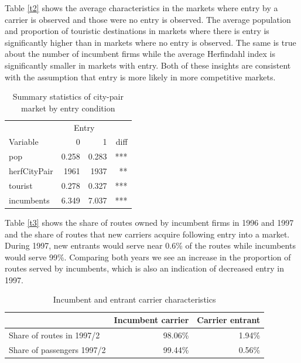 \documentclass[12pt,english]{article}
\begin{document}
\begin{enumerate}
Table \eqref{t2} shows the average characteristics in the markets where entry by a carrier is observed and those were no entry is observed. The average population and proportion of touristic destinations in markets where there is entry is significantly higher than in markets where no entry is observed. The same is true about the number of incumbent firms while the average Herfindahl index is significantly smaller in markets with entry. Both of these insights are consistent with the assumption that entry is more likely in more competitive markets. 

\begin{table}[H]
  \centering
  \caption{Summary statistics of city-pair market by entry condition}
    \begin{tabular}{lrrr}
    \hline
          & \multicolumn{2}{c}{Entry} &  \\
    \cline{2-3}
    Variable & 0     & 1     & diff \\
    \hline
    pop   & 0.258 & 0.283 & *** \\
    herfCityPair & 1961  & 1937  & ** \\
    tourist & 0.278 & 0.327 & *** \\
    incumbents & 6.349 & 7.037 & *** \\
    \hline
    \end{tabular}%
  \label{t2}%
\end{table}

Table \eqref{t3} shows the share of routes owned by incumbent firms in 1996 and 1997 and the share of routes that new carriers acquire following entry into a market. During 1997, new entrants would serve near 0.6\% of the routes while incumbents would serve 99\%. Comparing both years we see an increase in the proportion of routes served by incumbents, which is also an indication of decreased entry in 1997.

\begin{table}[H]
  \centering
  \caption{Incumbent and entrant carrier characteristics}
    \begin{tabular}{lrr}
    \hline
          & Incumbent carrier & Carrier entrant \\
    \hline
    Share of routes in 1997/2 & 98.06\% & 1.94\% \\
    Share of passengers 1997/2 & 99.44\% & 0.56\% \\
    \hline
    \end{tabular}%
  \label{t3}%
\end{table}


\end{enumerate}
\end{document}
